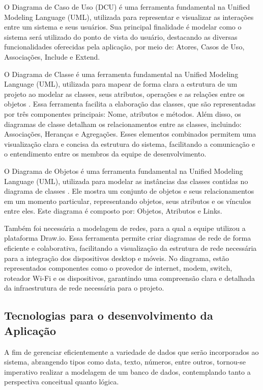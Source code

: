 O Diagrama de Caso de Uso (DCU) é uma ferramenta fundamental na Unified Modeling Language (UML), utilizada para representar e visualizar as interações entre um sistema e seus usuários. Sua principal finalidade é modelar como o sistema será utilizado do ponto de vista do usuário, destacando as diversas funcionalidades oferecidas pela aplicação, por meio de: Atores, Casos de Uso, Associações, Include e Extend.

O Diagrama de Classe é uma ferramenta fundamental na Unified Modeling Language (UML), utilizada para mapear de forma clara a estrutura de um projeto ao modelar as classes, seus atributos, operações e as relações entre os objetos \cite{Bezerra.E}. Essa ferramenta facilita a elaboração das classes, que são representadas por três componentes principais: Nome, atributos e métodos. Além disso, os diagramas de classe detalham os relacionamentos entre as classes, incluindo: Associações, Heranças e Agregações. Esses elementos combinados permitem uma visualização clara e concisa da estrutura do sistema, facilitando a comunicação e o entendimento entre os membros da equipe de desenvolvimento.

O Diagrama de Objetos é uma ferramenta fundamental na Unified Modeling Language (UML), utilizada para modelar as instâncias das classes contidas no diagrama de classes \cite{Bezerra.E}. Ele mostra um conjunto de objetos e seus relacionamentos em um momento particular, representando objetos, seus atributos e os vínculos entre eles. Este diagrama é composto por: Objetos, Atributos e Links.

Também foi necessária a modelagem de redes, para a qual a equipe utilizou a plataforma Draw.io. Essa ferramenta permite criar diagramas de rede de forma eficiente e colaborativa, facilitando a visualização da estrutura de rede necessária para a integração dos dispositivos desktop e móveis. No diagrama, estão representados componentes como o provedor de internet, modem, switch, roteador Wi-Fi e os dispositivos, garantindo uma compreensão clara e detalhada da infraestrutura de rede necessária para o projeto.


\subsection*{Tecnologias para o desenvolvimento da Aplicação}
A fim de gerenciar eficientemente a variedade de dados que serão incorporados ao sistema, abrangendo tipos como data, texto, números, entre outros, tornou-se imperativo realizar a modelagem de um banco de dados, contemplando tanto a perspectiva conceitual quanto lógica.

